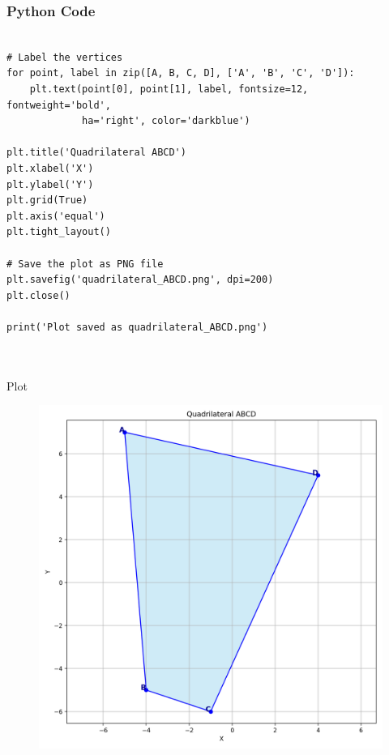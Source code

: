 \documentclass{beamer}
\begin{document}
\begin{frame}[fragile]
    \frametitle{Python Code}
    \begin{lstlisting}

# Label the vertices
for point, label in zip([A, B, C, D], ['A', 'B', 'C', 'D']):
    plt.text(point[0], point[1], label, fontsize=12, fontweight='bold',
             ha='right', color='darkblue')

plt.title('Quadrilateral ABCD')
plt.xlabel('X')
plt.ylabel('Y')
plt.grid(True)
plt.axis('equal')
plt.tight_layout()

# Save the plot as PNG file
plt.savefig('quadrilateral_ABCD.png', dpi=200)
plt.close()

print('Plot saved as quadrilateral_ABCD.png')



    \end{lstlisting}
\end{frame}




  
\begin{frame}{Plot}

\begin{figure}
    \centering
    \includegraphics[width=0.5\linewidth]{Beamer/figs/quadrilateral_ABCD.png}
    \caption{}
    \label{fig:placeholder}
\end{figure}

\end{frame}
\end{document}
